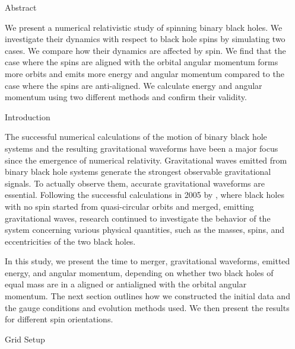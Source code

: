 \documentclass[noamssymb]{beamer}
\newlength{\sepwidth}
\newlength{\colwidth}
\newcommand{\separatorcolumn}{\begin{column}{\sepwidth}\end{column}}
\begin{document}
\begin{frame}[t]
\begin{columns}[t]
\separatorcolumn

\begin{column}{\colwidth}

  \begin{block}{Abstract}

    We present a numerical relativistic study of spinning binary black holes. We investigate their dynamics with respect to black hole spins by simulating two cases. We compare how their dynamics are affected by spin. We find that the case where the spins are aligned with the orbital angular momentum forms more orbits and emits more energy and angular momentum compared to the case where the spins are anti-aligned. We calculate energy and angular momentum using two different methods and confirm their validity.

  \end{block}
  
  \begin{block}{Introduction}
  	
  	The successful numerical calculations of the motion of binary black hole systems and the resulting gravitational waveforms have been a major focus since the emergence of numerical relativity. Gravitational waves emitted from binary black hole systems generate the strongest observable gravitational signals. To actually observe them, accurate gravitational waveforms are essential. Following the successful calculations in 2005 by \cite{Campanelli:2005dd, Baker:2005vv, Pretorius:2005gq}, where black holes with no spin started from quasi-circular orbits and merged, emitting gravitational waves, research continued to investigate the behavior of the system concerning various physical quantities, such as the masses, spins, and eccentricities of the two black holes.
  	
  	In this study, we present the time to merger, gravitational waveforms, emitted energy, and angular momentum, depending on whether two black holes of equal mass are in a aligned or antialigned with the orbital angular momentum. The next section outlines how we constructed the initial data and the gauge conditions and evolution methods used. We then present the results for different spin orientations.
  	
  \end{block}
  
  \begin{block}{Grid Setup}
  	

\end{block}
\end{column}
\end{columns}
\end{frame}
\end{document}
